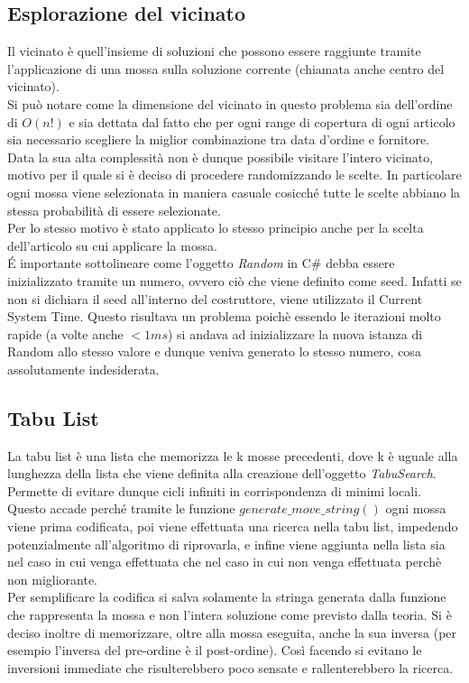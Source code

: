 \subsection{Esplorazione del vicinato}
\label{sec:esplorazione-vicinato}
\noindent Il vicinato è quell'insieme di soluzioni che possono essere raggiunte
tramite l'applicazione di una mossa sulla soluzione corrente (chiamata anche centro del vicinato).\\
Si può notare come la dimensione del vicinato in questo problema sia dell'ordine di $O(n!)$ e sia dettata dal fatto che
per ogni range di copertura di ogni articolo sia necessario scegliere la miglior
combinazione tra data d'ordine e fornitore.\\
Data la sua alta complessità non è dunque possibile visitare l'intero vicinato,
motivo per il quale si è deciso di procedere randomizzando le scelte.
In particolare ogni mossa viene selezionata in maniera casuale cosicché tutte le scelte
abbiano la stessa probabilità di essere selezionate.\\
Per lo stesso motivo è stato applicato lo stesso principio anche per la scelta dell'articolo su cui applicare
la mossa.\\
É importante sottolineare come l'oggetto \textit{Random} in C\#
debba essere inizializzato tramite un numero, ovvero
ciò che viene definito come seed. Infatti se non si dichiara
il seed all'interno del costruttore, viene utilizzato il
Current System Time. Questo risultava un problema poichè essendo le
iterazioni molto rapide (a volte anche $<1ms$) si andava ad inizializzare la nuova istanza
di Random allo stesso valore e dunque veniva generato lo stesso
numero, cosa assolutamente indesiderata.


\subsection{Tabu List}
\label{sec:tabu-list}
\noindent La tabu list è una lista che memorizza le k mosse precedenti, dove k è uguale
alla lunghezza della lista che viene definita alla creazione dell'oggetto \textit{TabuSearch}.\\
Permette di evitare dunque cicli infiniti in corrispondenza
di minimi locali. Questo accade perché tramite le funzione $generate\_move\_string()$ ogni mossa
viene prima codificata, poi viene effettuata una ricerca nella tabu list, impedendo potenzialmente all’algoritmo di riprovarla,
e infine viene aggiunta nella lista sia nel caso in cui venga effettuata che nel caso in cui non venga effettuata perchè non migliorante.\\
Per semplificare la codifica si salva solamente la stringa generata dalla funzione che rappresenta la mossa e non l’intera
soluzione come previsto dalla teoria.
Si è deciso inoltre di memorizzare, oltre alla mossa eseguita, anche la sua inversa
(per esempio l'inversa del pre-ordine è il post-ordine). Così facendo si
evitano le inversioni immediate che risulterebbero poco sensate e rallenterebbero la ricerca.

